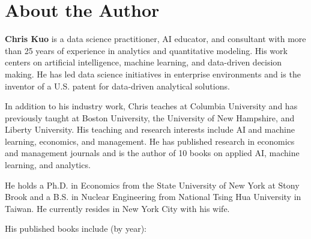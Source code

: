 \chapter*{About the Author} 

\textbf{Chris Kuo} is a data science practitioner, AI educator, and consultant with more than 25 years of experience in analytics and quantitative modeling. His work centers on artificial intelligence, machine learning, and data-driven decision making. 
He has led data science initiatives in enterprise environments and is the inventor of a U.S. patent for data-driven analytical solutions.

In addition to his industry work, Chris teaches at Columbia University and has previously taught at Boston University, the University of New Hampshire, and Liberty University. His teaching and research interests include AI and machine learning, economics, and management. He has published research in economics and management journals and is the author of 10 books on applied AI, machine learning, and analytics. 

He holds a Ph.D. in Economics from the State University of New York at Stony Brook and a B.S. in Nuclear Engineering from National Tsing Hua University in Taiwan. He currently resides in New York City with his wife. 

His published books include (by year):


